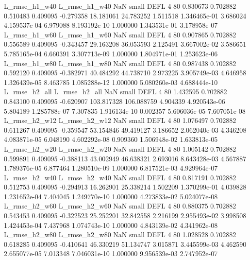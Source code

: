  L_rmse_h1_w40  L_rmse_h1_w40                   NaN      small     DEFL                 4 80 0.830673       0.702882 0.510483       0.409095   -0.279358     18.181061     24.783252     1.511518   1.346465e-01  3.686024 4.159537e-04     6.979088   8.193192e-10            1.000000    1.343531e-01        3.178958e-07
 L_rmse_h1_w60  L_rmse_h1_w60                   NaN      small     DEFL                 4 80 0.907865       0.702882 0.556589       0.409095   -0.343457     29.163208     36.053593     2.125491   3.667002e-02  3.586651 5.785165e-04     6.660391   3.307713e-09            1.000000    1.804971e-01        1.253623e-06
 L_rmse_h1_w80  L_rmse_h1_w80                   NaN      small     DEFL                 4 80 0.987438       0.702882 0.592120       0.409095   -0.382971     40.484292     44.738710     2.973225   3.905749e-03  4.646958 1.326439e-05     8.463785   1.085288e-12            1.000000    5.080260e-03        4.688444e-10
 L_rmse_h2_all  L_rmse_h2_all                   NaN      small     DEFL                 4 80 1.432595       0.702882 0.843100       0.409095   -0.620907    103.817328    106.088759     4.904339   4.920543e-06  5.804189 1.285788e-07     7.307835   1.916134e-10            0.002357    5.606036e-05        7.607051e-08
 L_rmse_h2_w12  L_rmse_h2_w12                   NaN      small     DEFL                 4 80 1.076497       0.702882 0.611267       0.409095   -0.359547     53.154846     49.419127     3.186652   2.062040e-03  4.346208 4.083871e-05     6.048190   4.602292e-08            0.909360    1.506948e-02        1.633813e-05
 L_rmse_h2_w20  L_rmse_h2_w20                   NaN      small     DEFL                 4 80 1.005142       0.702882 0.599891       0.409095   -0.388113     43.002949     46.638321     2.693016   8.643428e-03  4.567887 1.789376e-05     6.877464   1.280510e-09            1.000000    6.817521e-03        4.929964e-07
 L_rmse_h2_w40  L_rmse_h2_w40                   NaN      small     DEFL                 4 80 0.817191       0.702882 0.512753       0.409095   -0.294913     16.262901     25.338214     1.502209   1.370299e-01  4.039828 1.231652e-04     7.404045   1.249770e-10            1.000000    4.273833e-02        5.024077e-08
 L_rmse_h2_w60  L_rmse_h2_w60                   NaN      small     DEFL                 4 80 0.880375       0.702882 0.543453       0.409095   -0.322523     25.252201     32.842558     2.216199   2.955493e-02  3.998508 1.424453e-04     7.437968   1.074743e-10            1.000000    4.843139e-02        4.341962e-08
 L_rmse_h2_w80  L_rmse_h2_w80                   NaN      small     DEFL                 4 80 1.028528       0.702882 0.618285       0.409095   -0.410641     46.330219     51.134747     3.015871   3.445599e-03  4.462590 2.655077e-05     7.013348   7.046031e-10            1.000000    9.956539e-03        2.747952e-07
